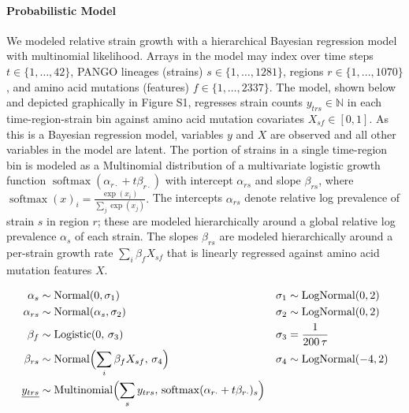 \documentclass[12pt]{article}
\begin{document}
\paragraph*{Probabilistic Model}

% 

We modeled relative strain growth with a hierarchical Bayesian regression model with multinomial likelihood.
Arrays in the model may index over time steps $t\in \{1,\dots,42\}$, PANGO lineages (strains) $s\in\{1,\dots,1281\}$, regions $r\in\{1,...,1070\}$, and amino acid mutations (features) $f\in\{1,\dots,2337\}$.
The model, shown below and depicted graphically in Figure S1, regresses strain counts $y_{trs}\in\mathbb N$ in each time-region-strain bin against amino acid mutation covariates $X_{sf} \in [0,1]$.
As this is a Bayesian regression model, variables $y$ and $X$ are observed and all other variables in the model are latent.
The portion of strains in a single time-region bin is modeled as a Multinomial distribution of a multivariate logistic growth function $\operatorname{softmax}(\alpha_{r\cdot} + t\beta_{r\cdot})$ with intercept $\alpha_{rs}$ and slope $\beta_{rs}$, where
$
  \operatorname{softmax}(x)_i = \frac {\exp(x_i)} {\sum_j \exp(x_j)}.
$
The intercepts $\alpha_{rs}$ denote relative log prevalence of strain $s$ in region $r$; these are modeled hierarchically around a global relative log prevalence $\alpha_s$ of each strain.
The slopes $\beta_{rs}$ are modeled hierarchically around a per-strain growth rate $\sum_i \beta_f X_{sf}$ that is linearly regressed against amino acid mutation features $X$.

\begin{align*}
  \textstyle
  \alpha_s &\sim \operatorname{Normal}(0, \sigma_1) &
  \sigma_1 &\sim \operatorname{LogNormal}(0, 2) \\
  \alpha_{rs} &\sim \operatorname{Normal}(\alpha_s, \sigma_2) &
  \sigma_2 &\sim \operatorname{LogNormal}(0, 2) \\
  \beta_f &\sim \operatorname{Logistic}(0,\, \sigma_3) &
  \sigma_3 &= \frac{1}{200\, \tau} \\
  \beta_{rs} &\sim \operatorname{Normal}\Bigl(
   \sum_i \beta_f X_{sf},\, \sigma_4
  \Bigr) &
  \sigma_4 &\sim \operatorname{LogNormal}(-4, 2) \\
  \underline{y_{trs}} &\sim \operatorname{Multinomial}\Bigl(
    \sum_s y_{trs},\, \operatorname{softmax}(\alpha_{r\cdot} + t \beta_{r\cdot})_s
  \Bigr)
\end{align*}
\end{document}
